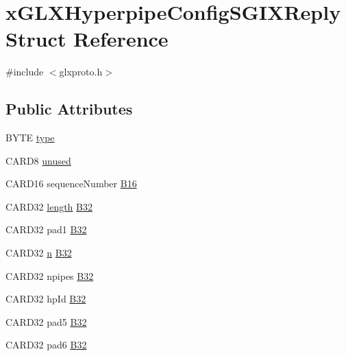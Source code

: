 \hypertarget{structx_g_l_x_hyperpipe_config_s_g_i_x_reply}{}\section{x\+G\+L\+X\+Hyperpipe\+Config\+S\+G\+I\+X\+Reply Struct Reference}
\label{structx_g_l_x_hyperpipe_config_s_g_i_x_reply}


{\ttfamily \#include $<$glxproto.\+h$>$}

\subsection*{Public Attributes}
\begin{DoxyCompactItemize}
\item 
B\+Y\+TE \hyperlink{structx_g_l_x_hyperpipe_config_s_g_i_x_reply_a74cb1050379354128bf6c0adfe8011b3}{type}
\item 
C\+A\+R\+D8 \hyperlink{structx_g_l_x_hyperpipe_config_s_g_i_x_reply_a174916817a27ce174a1cfda4bbd2f043}{unused}
\item 
C\+A\+R\+D16 sequence\+Number \hyperlink{structx_g_l_x_hyperpipe_config_s_g_i_x_reply_a7f8e8d67cc51f8595a653d5ea84aadb6}{B16}
\item 
C\+A\+R\+D32 \hyperlink{glcorearb_8h_ab9c919755bde3b34349e23a32b4e0fa7}{length} \hyperlink{structx_g_l_x_hyperpipe_config_s_g_i_x_reply_ae4c6e16a1dbdd630b5ea493f02177f8d}{B32}
\item 
C\+A\+R\+D32 pad1 \hyperlink{structx_g_l_x_hyperpipe_config_s_g_i_x_reply_ae2cbfc84a68469926c5acc1ce070f278}{B32}
\item 
C\+A\+R\+D32 \hyperlink{glcorearb_8h_ae2b4646468bc89d0ba646f5cf838e051}{n} \hyperlink{structx_g_l_x_hyperpipe_config_s_g_i_x_reply_a14c6bf6022c01d7097804080efdca0b9}{B32}
\item 
C\+A\+R\+D32 npipes \hyperlink{structx_g_l_x_hyperpipe_config_s_g_i_x_reply_aa4079e98836a4a8eba16304a701d854c}{B32}
\item 
C\+A\+R\+D32 hp\+Id \hyperlink{structx_g_l_x_hyperpipe_config_s_g_i_x_reply_ac8465a57bc1a91656d86072635cf0ad0}{B32}
\item 
C\+A\+R\+D32 pad5 \hyperlink{structx_g_l_x_hyperpipe_config_s_g_i_x_reply_a173f270bd24d4dd36c4c552fe873e405}{B32}
\item 
C\+A\+R\+D32 pad6 \hyperlink{structx_g_l_x_hyperpipe_config_s_g_i_x_reply_af99ed803b609e3db14d626bd731f2d5b}{B32}
\end{DoxyCompactItemize}


